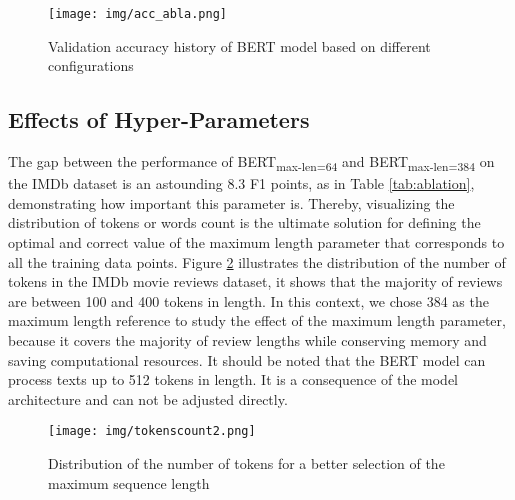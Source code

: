 \documentclass{article}
\begin{document}
\begin{figure}[ht]
	\centering
	\texttt{[image: img/acc\_abla.png]}
        \vspace{.7em}
    \caption{Validation accuracy history of BERT model based on different configurations}
    \label{fig:ablaacc}
\end{figure}

\subsection{Effects of Hyper-Parameters}
The gap between the performance of BERT\textsubscript{max-len=64} and BERT\textsubscript{max-len=384} on the IMDb dataset is an astounding 8.3 F1 points, as in Table \ref{tab:ablation}, demonstrating how important this parameter is. Thereby, visualizing the distribution of tokens or words count is the ultimate solution for defining the optimal and correct value of the maximum length parameter that corresponds to all the training data points. Figure \ref{fig:tkncount} illustrates the distribution of the number of tokens in the IMDb movie reviews dataset, it shows that the majority of reviews are between 100 and 400 tokens in length. In this context, we chose 384 as the maximum length reference to study the effect of the maximum length parameter, because it covers the majority of review lengths while conserving memory and saving computational resources. It should be noted that the BERT model can process texts up to 512 tokens in length. It is a consequence of the model architecture and can not be adjusted directly.


\begin{figure}[ht]
    \centering
    \texttt{[image: img/tokenscount2.png]}
        \vspace{.5em}
    \caption{Distribution of the number of tokens for a better selection of the maximum sequence length}
    \label{fig:tkncount}
\end{figure}
\end{document}
